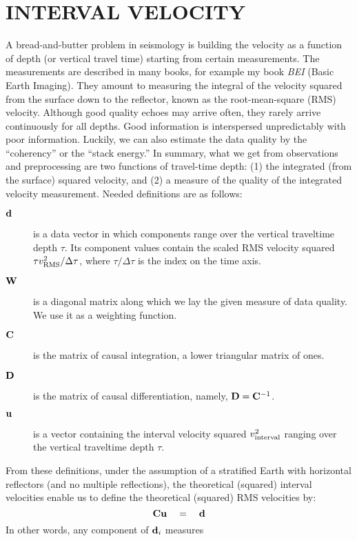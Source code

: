 \section{INTERVAL VELOCITY}
A bread-and-butter problem in seismology is building the velocity
as a function of depth (or vertical travel time)
starting from certain measurements.
The measurements are described in many books, for example
my book
{\em BEI} (Basic Earth Imaging).
They amount to measuring the integral of the velocity squared
from the surface down to the reflector,
known as the root-mean-square (RMS) velocity.
Although good quality echoes may arrive often,
they rarely arrive continuously for all depths.
Good information is interspersed unpredictably with poor information.
Luckily, we can
also estimate
the data quality by the ``coherency'' or the
``stack energy.''
In summary, what we get from observations and preprocessing
are two functions of travel-time depth:
(1) the integrated (from the surface) squared velocity, and
(2) a measure of the quality of the integrated velocity measurement.
Needed definitions are as follows:
\begin{description}
\item  [$\bold d$]
is a data vector in which components range over the vertical
traveltime depth $\tau$.
Its component values contain the scaled RMS velocity squared
$\tau v_{\rm RMS}^2/\Delta \tau $,
where
$\tau /\Delta \tau $ is the index on the time axis.
\item [$\bold W$]
is a diagonal matrix along which we lay the given measure
of data quality.  We use it as a weighting function.
\item  [$\bold C$]
is the matrix of causal integration, a lower triangular matrix of ones.
\item  [$\bold D$]
is the matrix of causal differentiation, namely, $\bold D=\bold C^{-1}$.
\item [$\bold u$]
is a vector containing the interval velocity squared $v_{\rm interval}^2 $
ranging over the vertical traveltime depth $\tau$.
\end{description}
From these definitions,
under the assumption of a stratified Earth with horizontal reflectors
(and no multiple reflections),
the theoretical (squared) interval velocities
enable us to define the theoretical (squared) RMS velocities by:
\begin{equation}
\bold C\bold u \quad =\quad \bold d 
\end{equation}
In other words, any component of $\bold d_i$ measures
